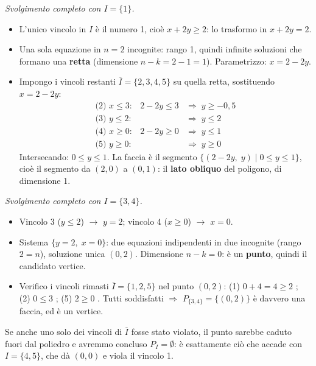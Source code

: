 \documentclass[12pt]{extarticle} %
\begin{document}
\medskip
\noindent\textit{Svolgimento completo con $I=\{1\}$.}
\begin{itemize}
    \item[\textbf{1.}] L'unico vincolo in $I$ è il numero 1, cioè $x+2y\ge2$: lo trasformo in $x+2y=2$.
    \item[\textbf{2.}] Una sola equazione in $n=2$ incognite: rango 1, quindi infinite soluzioni che formano una \textbf{retta} (dimensione $n-k = 2-1 = 1$). Parametrizzo: $x = 2-2y$.
    \item[\textbf{3.}] Impongo i vincoli restanti $\overline{I}=\{2,3,4,5\}$ su quella retta, sostituendo $x=2-2y$:
    \[
    \begin{array}{lll}
    \text{(2) } x\le3: & 2-2y\le3 & \Rightarrow\; y \ge -0{,}5\\
    \text{(3) } y\le2: & & \Rightarrow\; y \le 2\\
    \text{(4) } x\ge0: & 2-2y\ge0 & \Rightarrow\; y \le 1\\
    \text{(5) } y\ge0: & & \Rightarrow\; y \ge 0
    \end{array}
    \]
    Intersecando: $0 \le y \le 1$. La faccia è il segmento $\{(2-2y,\;y) \mid 0\le y\le1\}$, cioè il segmento da $(2,0)$ a $(0,1)$: il \textbf{lato obliquo} del poligono, di dimensione 1.
\end{itemize}

\medskip
\noindent\textit{Svolgimento completo con $I=\{3,4\}$.}
\begin{itemize}
    \item[\textbf{1.}] Vincolo 3 ($y\le2$) $\to$ $y=2$; vincolo 4 ($x\ge0$) $\to$ $x=0$.
    \item[\textbf{2.}] Sistema $\{y=2,\;x=0\}$: due equazioni indipendenti in due incognite (rango $2=n$), soluzione unica $(0,2)$. Dimensione $n-k=0$: è un \textbf{punto}, quindi il candidato vertice.
    \item[\textbf{3.}] Verifico i vincoli rimasti $\overline{I}=\{1,2,5\}$ nel punto $(0,2)$: \;(1) $0+4=4\ge2$ \checkmark; \;(2) $0\le3$ \checkmark; \;(5) $2\ge0$ \checkmark. Tutti soddisfatti $\Rightarrow$ $P_{\{3,4\}}=\{(0,2)\}$ è davvero una faccia, ed è un vertice.
\end{itemize}
Se anche uno solo dei vincoli di $\overline{I}$ fosse stato violato, il punto sarebbe caduto fuori dal poliedro e avremmo concluso $P_I=\emptyset$: è esattamente ciò che accade con $I=\{4,5\}$, che dà $(0,0)$ e viola il vincolo 1.
\end{document}
